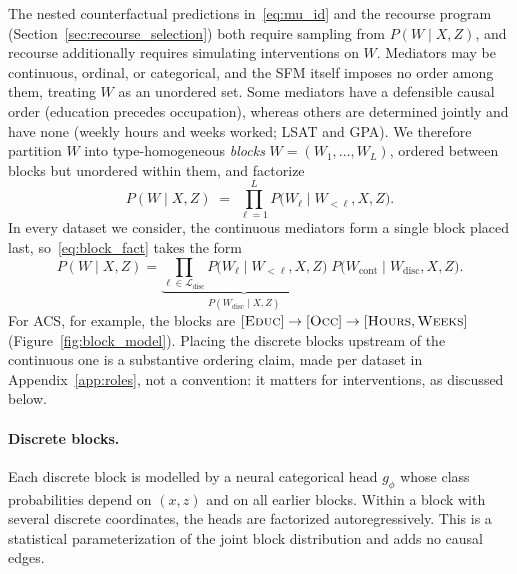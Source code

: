 The nested counterfactual predictions in~\eqref{eq:mu_id} and the recourse
program (Section~\ref{sec:recourse_selection}) both require sampling from
$P(W\mid X,Z)$, and recourse additionally requires simulating interventions on
$W$. Mediators may be continuous, ordinal, or categorical, and the SFM itself
imposes no order among them, treating $W$ as an unordered set. Some mediators
have a defensible causal order (education precedes occupation), whereas others
are determined jointly and have none (weekly hours and weeks worked; LSAT and
GPA). We therefore partition $W$ into type-homogeneous \emph{blocks}
$W=(W_1,\ldots,W_L)$, ordered between blocks but unordered within them, and
factorize
\begin{equation}
  P(W\mid X,Z)\;=\;\prod_{\ell=1}^{L} P\bigl(W_\ell\mid W_{<\ell},X,Z\bigr).
  \label{eq:block_fact}
\end{equation}
In every dataset we consider, the continuous mediators form a single block
placed last, so~\eqref{eq:block_fact} takes the form
\begin{equation}
  P(W\mid X,Z)=
  \underbrace{\prod_{\ell\in\mathcal L_{\mathrm{disc}}}
     P\bigl(W_\ell\mid W_{<\ell},X,Z\bigr)}_{P(W_{\mathrm{disc}}\mid X,Z)}
  \;P\bigl(W_{\mathrm{cont}}\mid W_{\mathrm{disc}},X,Z\bigr).
  \label{eq:cond_fact}
\end{equation}
For ACS, for example, the blocks are
$[\textsc{Educ}]\to[\textsc{Occ}]\to[\textsc{Hours},\textsc{Weeks}]$
(Figure~\ref{fig:block_model}). Placing the discrete blocks upstream of the
continuous one is a substantive ordering claim, made per dataset in
Appendix~\ref{app:roles}, not a convention: it matters for interventions, as
discussed below.

\paragraph{Discrete blocks.}
Each discrete block is modelled by a neural categorical head $g_\phi$ whose
class probabilities depend on $(x,z)$ and on all earlier blocks. Within a block
with several discrete coordinates, the heads are factorized
autoregressively. This is a statistical parameterization of the joint block
distribution and adds no causal edges.

